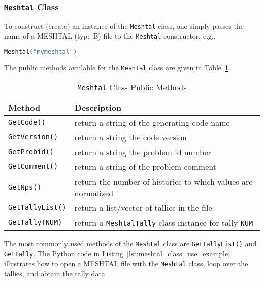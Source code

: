 \documentclass[11pt]{article}
\begin{document}
\subsubsection{\texttt{Meshtal} Class}\label{the-meshtal-class}

To construct (create) an instance of the \texttt{Meshtal} class, one simply
passes the name of a MESHTAL (type B) file to the \texttt{Meshtal} constructor,
e.g.,

\begin{lstlisting}[language=Python]
Meshtal("mymeshtal")
\end{lstlisting}

The public methods available for the \texttt{Meshtal} class are given in
Table~\ref{tab:meshtal_class_public_methods}.

\begin{table}[]
  \begin{center}
  \caption{\texttt{Meshtal} Class Public Methods}
  \label{tab:meshtal_class_public_methods}
    \begin{tabular}{lp{3.5in}}
      \toprule
        Method & Description \\
      \midrule
        \texttt{GetCode()}      & return a string of the generating code name \\
        \texttt{GetVersion()}   & return a string the code version \\
        \texttt{GetProbid()}    & return a string the problem id number \\
        \texttt{GetComment()}   & return a string of the problem comment \\
        \texttt{GetNps()}       & return the number of histories to which values are normalized \\
        \texttt{GetTallyList()} & return a list/vector of tallies in the file \\
        \texttt{GetTally(NUM)}  & return a \texttt{MeshtalTally} class instance for tally \texttt{NUM} \\
      \bottomrule
    \end{tabular}
  \end{center}
\end{table}

The most commonly used methods of the \texttt{Meshtal} class are
\texttt{GetTallyList()} and \texttt{GetTally}. The Python code in
Listing~\ref{lst:meshtal_class_use_example} illustrates how to open a MESHTAL
file with the \texttt{Meshtal} class, loop over the tallies, and obtain the
tally data
\end{document}
